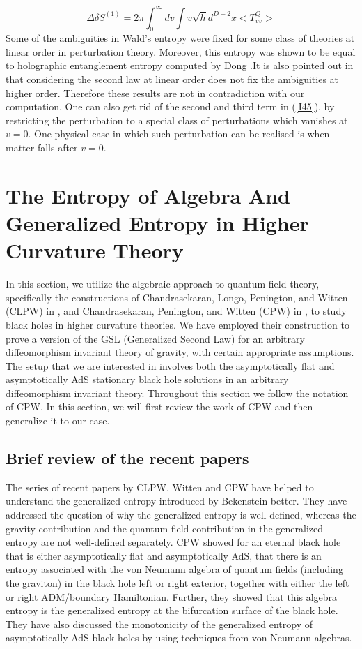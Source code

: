 \documentclass[12pt]{article}
\begin{document}
\begin{equation}\label{I46}
\Delta \delta S^{(1)}= 2\pi\int_{0}^{\infty}dv \int v \sqrt{h} d^{D-2}x   <T^{Q}_{vv}>
\end{equation}
Some of the ambiguities in Wald's entropy were fixed for some class of theories at linear order in perturbation theory\cite{Wall}. Moreover, this entropy was shown to be equal to holographic entanglement entropy computed by Dong \cite{Dong}.It is also pointed out in \cite{Wall} that considering the second law at linear order does not fix the ambiguities at higher order. Therefore these results are not in contradiction with our computation.  One can also get rid of the second and third term in (\ref{I45}), by restricting the perturbation to a special class of perturbations which vanishes at $v=0$. One physical case in which such perturbation can be realised is when matter falls after $v=0$.
\section {The Entropy of Algebra And Generalized Entropy in Higher Curvature Theory}
In this section, we utilize the algebraic approach to quantum field theory, specifically the constructions of Chandrasekaran, Longo,  Penington, and Witten (CLPW) in \cite{VRGE}, and Chandrasekaran, Penington, and Witten (CPW) in \cite{VGE}, to study black holes in higher curvature theories. We have employed their construction to prove a version of the GSL (Generalized Second Law) for an arbitrary diffeomorphism invariant theory of gravity, with certain appropriate assumptions.
The setup that we are interested in involves both the asymptotically flat and asymptotically AdS stationary black hole solutions in an arbitrary diffeomorphism invariant theory. Throughout this section we follow the notation of CPW. In this section, we will first review the work of CPW and then generalize it to our case.
\subsection{Brief review of the recent papers }
  The series of recent papers by CLPW, Witten and CPW \cite{VRGE, EW3, VGE} have helped to understand the generalized entropy introduced by Bekenstein \cite{JB} better. They have addressed the question of why the generalized entropy is well-defined, whereas the gravity contribution and the quantum field contribution in the generalized entropy are not well-defined separately. CPW showed for an eternal black hole that is either asymptotically flat and asymptotically AdS, that there is an entropy associated with the von Neumann algebra of quantum fields (including the graviton) in the black hole left or right exterior, together with either the left or right ADM/boundary Hamiltonian. Further, they showed that this algebra entropy is the generalized entropy at the bifurcation surface of the black hole. They have also discussed the monotonicity of the generalized entropy of asymptotically AdS black holes by using techniques from von Neumann algebras.
\end{document}
